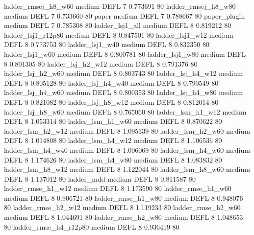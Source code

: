    ladder_rmsej_h8_w60     medium     DEFL                 7 0.773691 80
   ladder_rmsej_h8_w80     medium     DEFL                 7 0.733660 80
                 paper     medium     DEFL                 7 0.788667 80
          paper_plugin     medium     DEFL                 7 0.785308 80
       ladder_lsj1_all     medium     DEFL                 8 0.819212 80
    ladder_lsj1_r12p80     medium     DEFL                 8 0.847501 80
       ladder_lsj1_w12     medium     DEFL                 8 0.773753 80
       ladder_lsj1_w40     medium     DEFL                 8 0.832350 80
       ladder_lsj1_w60     medium     DEFL                 8 0.800781 80
       ladder_lsj1_w80     medium     DEFL                 8 0.801305 80
     ladder_lsj_h2_w12     medium     DEFL                 8 0.791376 80
     ladder_lsj_h2_w60     medium     DEFL                 8 0.803743 80
     ladder_lsj_h4_w12     medium     DEFL                 8 0.805128 80
     ladder_lsj_h4_w40     medium     DEFL                 8 0.790549 80
     ladder_lsj_h4_w60     medium     DEFL                 8 0.800353 80
     ladder_lsj_h4_w80     medium     DEFL                 8 0.821082 80
     ladder_lsj_h8_w12     medium     DEFL                 8 0.812014 80
     ladder_lsj_h8_w60     medium     DEFL                 8 0.765060 80
     ladder_lsm_h1_w12     medium     DEFL                 8 1.053314 80
     ladder_lsm_h1_w60     medium     DEFL                 8 0.870622 80
     ladder_lsm_h2_w12     medium     DEFL                 8 1.095339 80
     ladder_lsm_h2_w60     medium     DEFL                 8 1.014808 80
     ladder_lsm_h4_w12     medium     DEFL                 8 1.106536 80
     ladder_lsm_h4_w40     medium     DEFL                 8 1.006069 80
     ladder_lsm_h4_w60     medium     DEFL                 8 1.174626 80
     ladder_lsm_h4_w80     medium     DEFL                 8 1.083832 80
     ladder_lsm_h8_w12     medium     DEFL                 8 1.122044 80
     ladder_lsm_h8_w60     medium     DEFL                 8 1.137012 80
            ladder_mdd     medium     DEFL                 8 0.811587 80
    ladder_rmse_h1_w12     medium     DEFL                 8 1.173590 80
    ladder_rmse_h1_w60     medium     DEFL                 8 0.906721 80
    ladder_rmse_h1_w80     medium     DEFL                 8 0.948076 80
    ladder_rmse_h2_w12     medium     DEFL                 8 1.119233 80
    ladder_rmse_h2_w60     medium     DEFL                 8 1.044691 80
    ladder_rmse_h2_w80     medium     DEFL                 8 1.048653 80
 ladder_rmse_h4_r12p80     medium     DEFL                 8 0.936419 80
